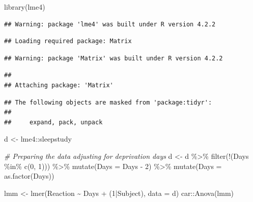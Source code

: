 \documentclass[
]{book}
\newenvironment{Shaded}{\begin{snugshade}}{\end{snugshade}}
\newcommand{\AttributeTok}[1]{\textcolor[rgb]{0.77,0.63,0.00}{#1}}
\newcommand{\CommentTok}[1]{\textcolor[rgb]{0.56,0.35,0.01}{\textit{#1}}}
\newcommand{\DecValTok}[1]{\textcolor[rgb]{0.00,0.00,0.81}{#1}}
\newcommand{\FunctionTok}[1]{\textcolor[rgb]{0.00,0.00,0.00}{#1}}
\newcommand{\NormalTok}[1]{#1}
\newcommand{\OtherTok}[1]{\textcolor[rgb]{0.56,0.35,0.01}{#1}}
\newcommand{\SpecialCharTok}[1]{\textcolor[rgb]{0.00,0.00,0.00}{#1}}
\begin{document}
\begin{Shaded}
\begin{Highlighting}[]
\FunctionTok{library}\NormalTok{(lme4)}
\end{Highlighting}
\end{Shaded}

\begin{verbatim}
## Warning: package 'lme4' was built under R version 4.2.2
\end{verbatim}

\begin{verbatim}
## Loading required package: Matrix
\end{verbatim}

\begin{verbatim}
## Warning: package 'Matrix' was built under R version 4.2.2
\end{verbatim}

\begin{verbatim}
## 
## Attaching package: 'Matrix'
\end{verbatim}

\begin{verbatim}
## The following objects are masked from 'package:tidyr':
## 
##     expand, pack, unpack
\end{verbatim}

\begin{Shaded}
\begin{Highlighting}[]
\NormalTok{d }\OtherTok{\textless{}{-}}\NormalTok{ lme4}\SpecialCharTok{::}\NormalTok{sleepstudy}

\CommentTok{\# Preparing the data adjusting for deprivation days}
\NormalTok{d }\OtherTok{\textless{}{-}}\NormalTok{ d }\SpecialCharTok{\%\textgreater{}\%} 
  \FunctionTok{filter}\NormalTok{(}\SpecialCharTok{!}\NormalTok{(Days }\SpecialCharTok{\%in\%} \FunctionTok{c}\NormalTok{(}\DecValTok{0}\NormalTok{, }\DecValTok{1}\NormalTok{))) }\SpecialCharTok{\%\textgreater{}\%} 
  \FunctionTok{mutate}\NormalTok{(}\AttributeTok{Days =}\NormalTok{ Days }\SpecialCharTok{{-}} \DecValTok{2}\NormalTok{) }\SpecialCharTok{\%\textgreater{}\%} 
  \FunctionTok{mutate}\NormalTok{(}\AttributeTok{Days =} \FunctionTok{as.factor}\NormalTok{(Days))}

\NormalTok{lmm }\OtherTok{\textless{}{-}} \FunctionTok{lmer}\NormalTok{(Reaction }\SpecialCharTok{\textasciitilde{}}\NormalTok{ Days }\SpecialCharTok{+}\NormalTok{ (}\DecValTok{1}\SpecialCharTok{|}\NormalTok{Subject), }\AttributeTok{data =}\NormalTok{ d)}
\NormalTok{car}\SpecialCharTok{::}\FunctionTok{Anova}\NormalTok{(lmm)}
\end{Highlighting}
\end{Shaded}
\end{document}
